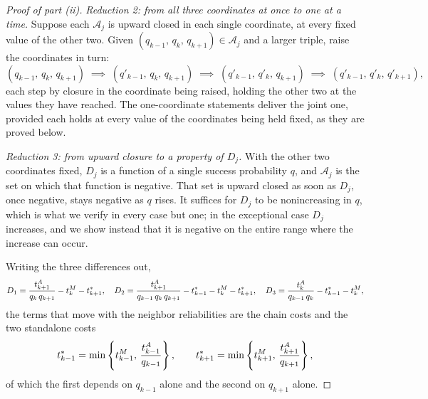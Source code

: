 \begin{proof}[Proof of part (ii)]
\emph{Reduction 2: from all three coordinates at once to one at a time.}
Suppose each $\mathcal{A}_j$ is upward closed in each single coordinate, at every fixed value of the other two.
Given $(q_{k-1},\, q_k,\, q_{k+1}) \in \mathcal{A}_j$ and a larger triple, raise the coordinates in turn:
\[ (q_{k-1},\, q_k,\, q_{k+1}) \;\implies\; (q'_{k-1},\, q_k,\, q_{k+1}) \;\implies\; (q'_{k-1},\, q'_k,\, q_{k+1}) \;\implies\; (q'_{k-1},\, q'_k,\, q'_{k+1}) , \]
each step by closure in the coordinate being raised, holding the other two at the values they have reached.
The one-coordinate statements deliver the joint one, provided each holds at every value of the coordinates being held fixed, as they are proved below.

\emph{Reduction 3: from upward closure to a property of $D_j$.}
With the other two coordinates fixed, $D_j$ is a function of a single success probability $q$, and $\mathcal{A}_j$ is the set on which that function is negative.
That set is upward closed as soon as $D_j$, once negative, stays negative as $q$ rises.
It suffices for $D_j$ to be nonincreasing in $q$, which is what we verify in every case but one; in the exceptional case $D_j$ increases, and we show instead that it is negative on the entire range where the increase can occur.

Writing the three differences out,
\[
D_1 = \frac{t^{A}_{k+1}}{q_k\, q_{k+1}} - t^{M}_{k} - t^*_{k+1}, \quad
D_2 = \frac{t^{A}_{k+1}}{q_{k-1}\, q_k\, q_{k+1}} - t^*_{k-1} - t^{M}_{k} - t^*_{k+1}, \quad
D_3 = \frac{t^{A}_{k}}{q_{k-1}\, q_k} - t^*_{k-1} - t^{M}_{k},
\]
the terms that move with the neighbor reliabilities are the chain costs and the two standalone costs
\[ t^*_{k-1} = \min\left\{ t^{M}_{k-1},\, \frac{t^{A}_{k-1}}{q_{k-1}} \right\}, \qquad t^*_{k+1} = \min\left\{ t^{M}_{k+1},\, \frac{t^{A}_{k+1}}{q_{k+1}} \right\}, \]
of which the first depends on $q_{k-1}$ alone and the second on $q_{k+1}$ alone.


\end{proof}
